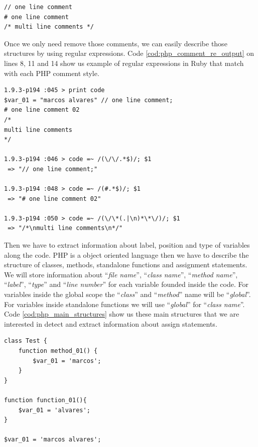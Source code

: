 \begin{lstlisting}[caption=PHP code comments,label=cod:php_comment]
// one line comment
# one line comment
/* multi line comments */
\end{lstlisting} 

Once we only need remove those comments, we can easily describe those structures by using regular expressions. Code \ref{cod:php_comment_re_output} on lines 8, 11 and 14 show us example of regular expressions in Ruby that match with each PHP comment style.

\begin{lstlisting}[caption=Regular expressions for each code comment structure in PHP, label=cod:php_comment_re_output]
1.9.3-p194 :045 > print code
$var_01 = "marcos alvares" // one line comment;
# one line comment 02
/*
multi line comments
*/

1.9.3-p194 :046 > code =~ /(\/\/.*$)/; $1
 => "// one line comment;"

1.9.3-p194 :048 > code =~ /(#.*$)/; $1
 => "# one line comment 02"

1.9.3-p194 :050 > code =~ /(\/\*(.|\n)*\*\/)/; $1
 => "/*\nmulti line comments\n*/"
\end{lstlisting}

Then we have to extract information about label, position and type of variables along the code. PHP is a object oriented language then we have to describe the structure of classes, methods, standalone functions and assignment statements. We will store information about ``\textit{file name}'', ``\textit{class name}'', ``\textit{method name}'', ``\textit{label}'', ``\textit{type}'' and ``\textit{line number}'' for each variable founded inside the code. For variables inside the global scope the ``\textit{class}'' and ``\textit{method}'' name will be ``\textit{global}''. For variables inside standalone functions we will use ``\textit{global}'' for ``\textit{class name}''. Code \ref{cod:php_main_structures} show us these main structures that we are interested in detect and extract information about assign statements.

\begin{lstlisting}[caption=Three different scenarios of assignment statements in PHP code, label=cod:php_main_structures]
class Test {
    function method_01() {
        $var_01 = 'marcos';
    }
}

function function_01(){
	$var_01 = 'alvares';
}

$var_01 = 'marcos alvares';
\end{lstlisting}


